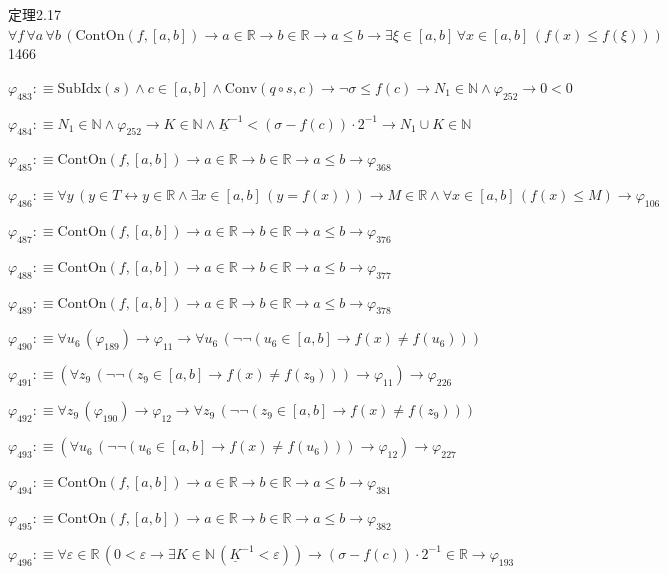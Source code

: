 \begin{fullproof}{定理2.17}{$\forall f\,\forall a\,\forall b\,(\mathrm{ContOn}(f,[a,b]) \to a \in \mathbb{R} \to b \in \mathbb{R} \to a \leq b \to \exists \xi \in [a,b]\,\forall x \in [a,b]\,(f(x) \leq f(\xi)))$}{1466}
\begin{abbrevlist}
\item $\varphi_{483} :\equiv \mathrm{SubIdx}(s) \land c \in [a,b] \land \mathrm{Conv}(q \circ s,c) \to \neg \sigma \leq f(c) \to N_{1} \in \mathbb{N} \land \varphi_{252} \to 0 < 0$
\item $\varphi_{484} :\equiv N_{1} \in \mathbb{N} \land \varphi_{252} \to K \in \mathbb{N} \land \underline{K}^{-1} < (\sigma - f(c)) \cdot 2^{-1} \to N_{1} \cup K \in \mathbb{N}$
\item $\varphi_{485} :\equiv \mathrm{ContOn}(f,[a,b]) \to a \in \mathbb{R} \to b \in \mathbb{R} \to a \leq b \to \varphi_{368}$
\item $\varphi_{486} :\equiv \forall y\,(y \in T \leftrightarrow y \in \mathbb{R} \land \exists x \in [a,b]\,(y = f(x))) \to M \in \mathbb{R} \land \forall x \in [a,b]\,(f(x) \leq M) \to \varphi_{106}$
\item $\varphi_{487} :\equiv \mathrm{ContOn}(f,[a,b]) \to a \in \mathbb{R} \to b \in \mathbb{R} \to a \leq b \to \varphi_{376}$
\item $\varphi_{488} :\equiv \mathrm{ContOn}(f,[a,b]) \to a \in \mathbb{R} \to b \in \mathbb{R} \to a \leq b \to \varphi_{377}$
\item $\varphi_{489} :\equiv \mathrm{ContOn}(f,[a,b]) \to a \in \mathbb{R} \to b \in \mathbb{R} \to a \leq b \to \varphi_{378}$
\item $\varphi_{490} :\equiv \forall u_{6}\,(\varphi_{189}) \to \varphi_{11} \to \forall u_{6}\,(\neg \neg (u_{6} \in [a,b] \to f(x) \neq f(u_{6})))$
\item $\varphi_{491} :\equiv (\forall z_{9}\,(\neg \neg (z_{9} \in [a,b] \to f(x) \neq f(z_{9}))) \to \varphi_{11}) \to \varphi_{226}$
\item $\varphi_{492} :\equiv \forall z_{9}\,(\varphi_{190}) \to \varphi_{12} \to \forall z_{9}\,(\neg \neg (z_{9} \in [a,b] \to f(x) \neq f(z_{9})))$
\item $\varphi_{493} :\equiv (\forall u_{6}\,(\neg \neg (u_{6} \in [a,b] \to f(x) \neq f(u_{6}))) \to \varphi_{12}) \to \varphi_{227}$
\item $\varphi_{494} :\equiv \mathrm{ContOn}(f,[a,b]) \to a \in \mathbb{R} \to b \in \mathbb{R} \to a \leq b \to \varphi_{381}$
\item $\varphi_{495} :\equiv \mathrm{ContOn}(f,[a,b]) \to a \in \mathbb{R} \to b \in \mathbb{R} \to a \leq b \to \varphi_{382}$
\item $\varphi_{496} :\equiv \forall \varepsilon \in \mathbb{R}\,(0 < \varepsilon \to \exists K \in \mathbb{N}\,(\underline{K}^{-1} < \varepsilon)) \to (\sigma - f(c)) \cdot 2^{-1} \in \mathbb{R} \to \varphi_{193}$

\end{abbrevlist}
\end{fullproof}
